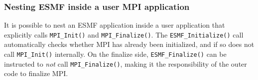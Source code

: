 
\setlength{\oldparskip}{\parskip}
\setlength{\parskip}{1.5ex}
\setlength{\oldparindent}{\parindent}
\setlength{\parindent}{0pt}
\setlength{\oldbaselineskip}{\baselineskip}
\setlength{\baselineskip}{11pt}
 
\def\bv{\begin{verbatim}}
\def\ev{\end{verbatim}}
\def\be{\begin{equation}}
\def\ee{\end{equation}}
\def\bea{\begin{eqnarray}}
\def\eea{\end{eqnarray}}
\def\bi{\begin{itemize}}
\def\ei{\end{itemize}}
\def\bn{\begin{enumerate}}
\def\en{\end{enumerate}}
\def\bd{\begin{description}}
\def\ed{\end{description}}
\def\({\left (}
\def\){\right )}
\def\[{\left [}
\def\]{\right ]}
\def\<{\left  \langle}
\def\>{\right \rangle}
\def\cI{{\cal I}}
\def\diag{\mathop{\rm diag}}
\def\tr{\mathop{\rm tr}}


 

  
   \subsubsection{Nesting ESMF inside a user MPI application}
   \label{vm_inside_user_mpi}
  
   \begin{sloppypar}
   It is possible to nest an ESMF application inside a user application that 
   explicitly calls {\tt MPI\_Init()} and {\tt MPI\_Finalize()}. The
   {\tt ESMF\_Initialize()} call automatically checks whether MPI has already
   been initialized, and if so does not call {\tt MPI\_Init()} internally. 
   On the finalize side, {\tt ESMF\_Finalize()} can be instructed to {\em not}
   call {\tt MPI\_Finalize()}, making it the responsibility of the outer code
   to finalize MPI.
   \end{sloppypar}
   
